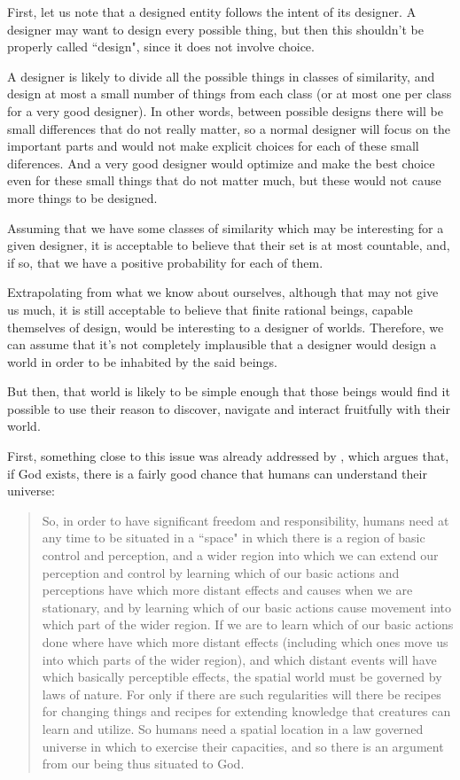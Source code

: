 \documentclass[a4paper
,draft
]{article}
\newcommand{\ghilimele}[1]{``#1"}
\begin{document}
First, let us note that a designed entity follows the intent of
its designer. A designer may want to design every possible thing, but then
this shouldn't be properly called \ghilimele{design}, since it does not involve
choice.

A designer is likely
to divide all the possible things in classes of similarity, and design at most
a small number of things from each class (or at most one per class for a very
good designer). In other words, between possible designs there will be small
differences that do not really matter, so a normal designer will focus on the
important parts and would not make explicit choices for each of these small
diferences. And a very good designer would optimize and make the best choice
even for these small things that do not matter much, but these
would not cause more things to be designed.

Assuming that we have some classes of similarity which may be interesting for
a given designer, it is acceptable to believe that their set is at most
countable, and, if so, that we have a positive probability for each of them.

Extrapolating from what we know about ourselves, although that may
not give us much, it is still acceptable to believe that
finite rational beings,
capable themselves of design, would be interesting to a designer of worlds.
Therefore, we can assume that it's not completely implausible that a designer
would design a world in order to be inhabited by the said beings.

But then, that world is likely to be simple enough that
those beings would find it possible to use their reason to
discover, navigate and interact fruitfully with their world.

First, something close to this issue was already addressed by
\textcite{Swinburne2003}, which argues that, if God exists,
there is a fairly good chance that humans can understand their universe:

\begin{quote}
  So, in order to have significant freedom and responsibility, humans need
  at any time to be situated in a \ghilimele{space} in which there is a
  region of basic control and perception, and a wider region into which
  we can extend our perception and control by learning which of our
  basic actions and perceptions have which more distant effects and causes
  when we are stationary, and by learning which of our basic actions cause
  movement into which part of the wider region.
  If we are to learn which of our basic actions done where have which
  more distant effects (including which ones move us into which parts
  of the wider region), and which distant events will have which basically
  perceptible effects, the spatial world must be governed by laws of nature.
  For only if there are such regularities will there be recipes for changing
  things and recipes for extending knowledge that creatures can learn and
  utilize.
  So humans need a spatial location in a law governed universe in which to
  exercise their capacities, and so there is an argument from our being thus
  situated to God.
\end{quote}
\end{document}
